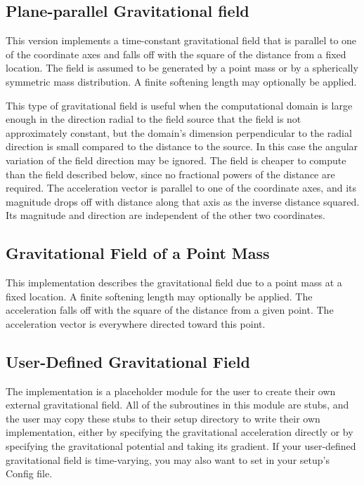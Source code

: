 \subsection{Plane-parallel Gravitational field}
This  version
implements a time-constant  gravitational field that is parallel to
one of the coordinate axes and falls off with the square of the
distance from a fixed location. The field is assumed to be generated
by a point mass or by a spherically symmetric mass distribution. A
finite softening length may optionally be applied.

This type of gravitational field
is useful when the computational domain is large enough in the
direction radial to the field source that the field is not
approximately constant, but the domain's dimension perpendicular to
the radial direction is small compared to the distance to the source.
In this case the angular variation of the field direction may be
ignored. The  field is cheaper to compute than the
 field described below,
since no fractional powers of the distance are
required. The acceleration vector is parallel to one of the coordinate
axes, and its magnitude drops off with distance along that axis as the
inverse distance squared. Its magnitude and direction are independent
of the other two coordinates.

\subsection{Gravitational Field of a Point Mass}
This  implementation
describes the gravitational field due to a point mass at a fixed
location. A finite softening length may optionally be applied. The
acceleration falls off with the square of the distance from a given
point. The acceleration vector is everywhere directed toward this point.

\subsection{User-Defined Gravitational Field}
The  implementation is a placeholder module for the user to
create their own external gravitational field. All of the subroutines in this
module are stubs, and the user may copy these stubs to their setup directory to
write their own implementation, either by specifying the gravitational
acceleration directly or by specifying the gravitational potential and taking
its gradient. If your user-defined gravitational field is time-varying, you
may also want to set  in your setup's
Config file.

